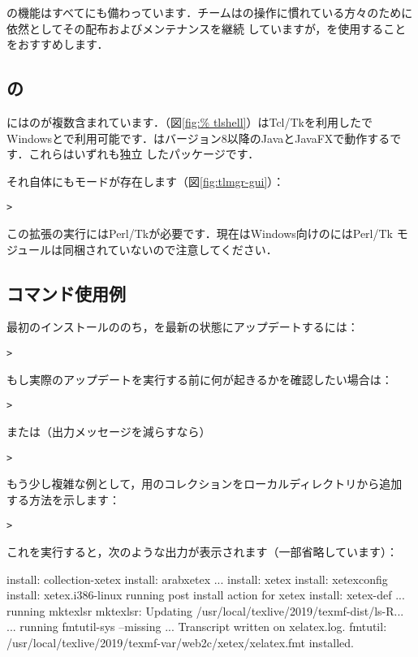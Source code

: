 \documentclass[uplatex,dvipdfmx]{jsarticle}
\begin{document}
の機能はすべてにも備わっています．\TL チームはの操作に慣れている方々のために依然としてその配布およびメンテナンスを継続
していますが，を使用することをおすすめします．

\subsection{の\GUI}

\TL にはの\GUI が複数含まれています．（図\ref{fig:%
tlshell}）はTcl/Tkを利用した\GUI でWindowsと\macOS で利用可能です．はバージョン8以降のJavaとJavaFXで動作する\GUI です．これらはいずれも独立
したパッケージです．

それ自体にも\GUI モードが存在します（図\ref{fig:tlmgr-gui}）：
%
\begin{alltt}
> 
\end{alltt}
%
この\GUI 拡張の実行にはPerl/Tkが必要です．現在はWindows向けの\TL にはPerl/Tk%
モジュールは同梱されていないので注意してください．

\subsection{コマンド使用例}

最初のインストールののち，\TL を最新の状態にアップデートするには：
%
\begin{alltt}
> 
\end{alltt}
%
もし実際のアップデートを実行する前に何が起きるかを確認したい場合は：
%
\begin{alltt}
> 
\end{alltt}
%
または（出力メッセージを減らすなら）
%
\begin{alltt}
> 
\end{alltt}

もう少し複雑な例として，\XeTeX 用のコレクションをローカルディレクトリから追加
する方法を示します：
%
\begin{alltt}
> 
\end{alltt}
%
これを実行すると，次のような出力が表示されます（一部省略しています）：
%
\begin{fverbatim}
install: collection-xetex
install: arabxetex
...
install: xetex
install: xetexconfig
install: xetex.i386-linux
running post install action for xetex
install: xetex-def
...
running mktexlsr
mktexlsr: Updating /usr/local/texlive/2019/texmf-dist/ls-R...
...
running fmtutil-sys --missing
...
Transcript written on xelatex.log.
fmtutil: /usr/local/texlive/2019/texmf-var/web2c/xetex/xelatex.fmt installed.
\end{fverbatim}
\end{document}
